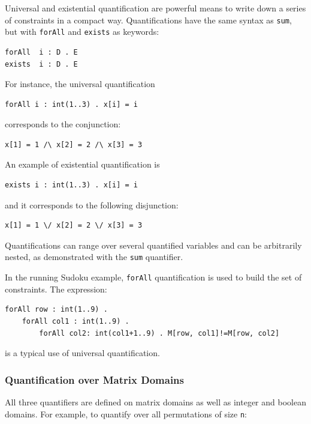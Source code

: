 \documentclass[a4paper]{article}
\begin{document}
Universal and existential quantification are powerful means to 
write down a series of constraints in a compact way. 
Quantifications have the same syntax as {\tt sum}, but with 
{\tt forAll} and {\tt exists} as keywords:

\begin{verbatim}
forAll  i : D . E
exists  i : D . E
\end{verbatim}

For instance, the universal quantification

\begin{verbatim}
forAll i : int(1..3) . x[i] = i
\end{verbatim}

corresponds to the conjunction:

\begin{verbatim}
x[1] = 1 /\ x[2] = 2 /\ x[3] = 3
\end{verbatim}

An example of existential quantification is

\begin{verbatim}
exists i : int(1..3) . x[i] = i
\end{verbatim}

and it corresponds to the following disjunction:

\begin{verbatim}
x[1] = 1 \/ x[2] = 2 \/ x[3] = 3
\end{verbatim}

Quantifications can range over several quantified variables and can 
be arbitrarily nested, as demonstrated with the {\tt sum} quantifier.

In the running Sudoku example, \texttt{forAll} quantification is used to build
the set of constraints. The expression:

\begin{verbatim}
forAll row : int(1..9) . 
    forAll col1 : int(1..9) .
        forAll col2: int(col1+1..9) . M[row, col1]!=M[row, col2]
\end{verbatim}

is a typical use of universal quantification. 

\subsubsection{Quantification over Matrix Domains}

All three quantifiers are defined on matrix domains as well as integer and 
boolean domains. For example, to quantify over all permutations of size \texttt{n}:
\end{document}
